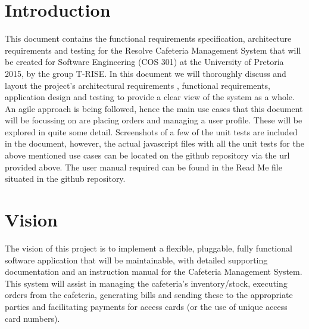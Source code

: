 \documentclass[12pt]{article}
\begin{document}
\maketitle
\break

\tableofcontents
\break


\section{Introduction}
This document contains the functional requirements specification, architecture requirements and testing for the Resolve Cafeteria Management System that will be created for Software Engineering (COS 301) at the University of Pretoria 2015, by the group T-RISE. In this document we will thoroughly discuss and layout the project's architectural requirements , functional requirements, application design and testing to provide a clear view of the system as a whole. An agile approach is being followed, hence the main use cases that this document will be focussing on are placing orders and managing a user profile. These will be explored in quite some detail. Screenshots of a few of the unit tests are included in the document, however, the actual javascript files with all the unit tests for the above mentioned use cases can be located on the github repository via the url provided above. The user manual required can be found in the Read Me file situated in the github repository.

\section{Vision}
The vision of this project is to implement a flexible, pluggable, fully functional software application that will be maintainable, with detailed supporting documentation and an instruction manual for the Cafeteria Management System. This system will assist in managing the cafeteria's inventory/stock, executing orders from the cafeteria, generating bills and sending these to the appropriate parties and facilitating payments for access cards (or the use of unique access card numbers). 

\end{document}
